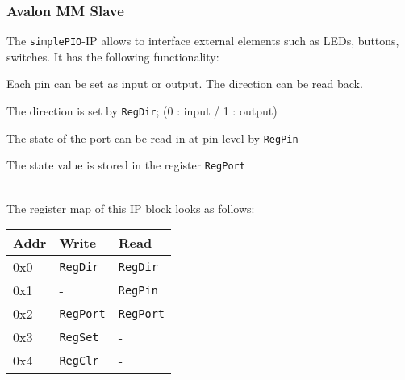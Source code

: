 		\subsubsection{Avalon MM Slave }
			\begin{multicols}{2}
				The \texttt{simplePIO}-IP allows to interface external elements such as LEDs, buttons, switches. It has the following functionality:
				\begin{compactitem}
					\item Each pin can be set as input or output. The direction can be read back.
					\item The direction is set by \texttt{RegDir}; (0 : input / 1 : output)
					\item The state of the port can be read in at pin level by \texttt{RegPin}
					\item The state value is stored in the register \texttt{RegPort}
				\end{compactitem} \ \\
		
				The register map of this IP block looks as follows: \\
				\begin{tabular}{|p{0.1\textwidth}|p{}|p{}|}
					\hline
					\textbf{Addr} & \textbf{Write} & \textbf{Read} \\
					\hline
					0x0 & \texttt{RegDir} & \texttt{RegDir} \\ \hline
					0x1 & - & \texttt{RegPin} \\ \hline
					0x2 & \texttt{RegPort} & \texttt{RegPort} \\ \hline
					0x3 & \texttt{RegSet} & - \\ \hline
					0x4 & \texttt{RegClr} & - \\ \hline
				\end{tabular}
			\end{multicols}	
			\begin{multicols}{2}		
				
			\end{multicols}			
			
		